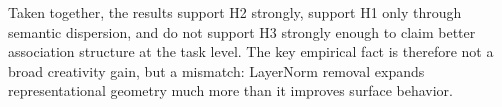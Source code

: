  Taken together, the results support H2 strongly, support H1 only through semantic dispersion, and do not support H3 strongly enough to claim better association structure at the task level. The key empirical fact is therefore not a broad creativity gain, but a mismatch: LayerNorm removal expands representational geometry much more than it improves surface behavior.
